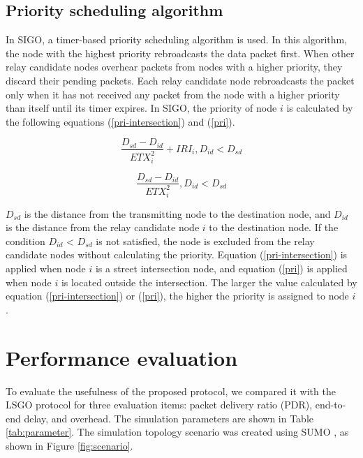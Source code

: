 \documentclass[conference]{IEEEtran}
\begin{document}


\subsection{Priority scheduling algorithm}
\label{priority}
In SIGO, a timer-based priority scheduling algorithm is used. 
In this algorithm, the node with the highest priority rebroadcasts the data packet first. 
When other relay candidate nodes overhear packets from nodes with a higher priority, they discard their pending packets. Each relay candidate node rebroadcasts the packet only when it has not received any packet from the node with a higher priority than itself until its timer expires.
In SIGO, the priority of node $i$ is calculated by the following equations (\ref{pri-intersection}) and (\ref{pri}).


\begin{equation}
\label{pri-intersection}
\frac{D_{sd} - D_{id}}{ETX_{i}^{2}} + IRI_i,  D_{id} < D_{sd}
\end{equation}

\begin{equation}
\label{pri}
\frac{D_{sd} - D_{id}}{ETX_{i}^{2}} ,   D_{id} < D_{sd}
\end{equation}

$D_{sd}$ is the distance from the transmitting node to the destination node, and $D_{id}$ is the distance from the relay candidate node $i$ to the destination node. If the condition $D_{id}$ < $D_{sd}$ is not satisfied, the node is excluded from the relay candidate nodes without calculating the priority. 
Equation (\ref{pri-intersection}) is applied when node $i$ is a street intersection node, and equation (\ref{pri}) is applied when node $i$ is located outside the intersection. 
The larger the value calculated by equation (\ref{pri-intersection}) or (\ref{pri}), the higher the priority is assigned to node $i$. 


\section{Performance evaluation}
\label{evaluation}
To evaluate the usefulness of the proposed protocol, we compared it with the LSGO protocol for three evaluation items: packet delivery ratio (PDR), end-to-end delay, and overhead.
The simulation parameters are shown in Table \ref{tab:parameter}. 
The simulation topology scenario was created using SUMO \cite{27}, as shown in Figure \ref{fig:scenario}. 
\end{document}
